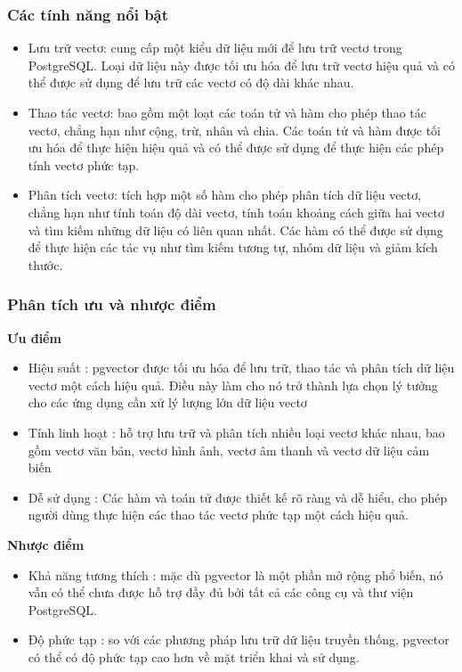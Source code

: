 \subsubsection{Các tính năng nổi bật}
\begin{itemize}
    \item Lưu trữ vectơ: cung cấp một kiểu dữ liệu mới để lưu trữ vectơ trong PostgreSQL. Loại dữ liệu này được tối ưu hóa để lưu trữ vectơ hiệu quả và có thể được sử dụng để lưu trữ các vectơ có độ dài khác nhau.
    \item Thao tác vectơ: bao gồm một loạt các toán tử và hàm cho phép thao tác vectơ, chẳng hạn như cộng, trừ, nhân và chia. Các toán tử và hàm được tối ưu hóa để thực hiện hiệu quả và có thể được sử dụng để thực hiện các phép tính vectơ phức tạp.
    \item Phân tích vectơ: tích hợp một số hàm cho phép phân tích dữ liệu vectơ, chẳng hạn như tính toán độ dài vectơ, tính toán khoảng cách giữa hai vectơ và tìm kiếm những dữ liệu có liên quan nhất. Các hàm có thể được sử dụng để thực hiện các tác vụ như tìm kiếm tương tự, nhóm dữ liệu và giảm kích thước.
\end{itemize}
\subsubsection{Phân tích ưu và nhược điểm}
\textbf{Ưu điểm}
\begin{itemize}
    \item Hiệu suất : pgvector được tối ưu hóa để lưu trữ, thao tác và phân tích dữ liệu vectơ một cách hiệu quả. Điều này làm cho nó trở thành lựa chọn lý tưởng cho các ứng dụng cần xử lý lượng lớn dữ liệu vectơ 
    \item Tính linh hoạt :  hỗ trợ lưu trữ và phân tích nhiều loại vectơ khác nhau, bao gồm vectơ văn bản, vectơ hình ảnh, vectơ âm thanh và vectơ dữ liệu cảm biến
    \item Dễ sử dụng : Các hàm và toán tử được thiết kế rõ ràng và dễ hiểu, cho phép người dùng thực hiện các thao tác vectơ phức tạp một cách hiệu quả.
\end{itemize}
\textbf{Nhược điểm}
\begin{itemize}
    \item Khả năng tương thích : mặc dù pgvector là một phần mở rộng phổ biến, nó vẫn có thể chưa được hỗ trợ đầy đủ bởi tất cả các công cụ và thư viện PostgreSQL.
    \item Độ phức tạp : so với các phương pháp lưu trữ dữ liệu truyền thống, pgvector có thể có độ phức tạp cao hơn về mặt triển khai và sử dụng.
\end{itemize}
